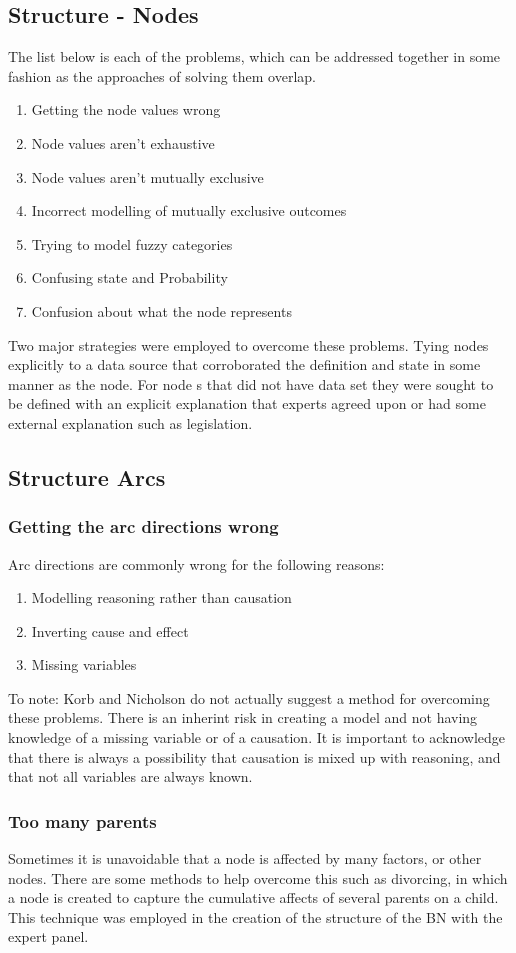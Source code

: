 \subsection{Structure - Nodes}
The list below is each of the problems, which can be addressed together in some fashion as the approaches of solving them overlap.
\begin{enumerate}
        \item Getting the node values wrong
        \item Node values aren't exhaustive
        \item Node values aren't mutually exclusive
        \item Incorrect modelling of mutually exclusive outcomes
        \item Trying to model fuzzy categories
        \item Confusing state and Probability
        \item Confusion about what the node represents
\end{enumerate}
Two major strategies were employed to overcome these problems. Tying nodes explicitly to a data source that corroborated the definition and state in some manner as the node. For node s that did not have data set they were sought to be defined with an explicit explanation that experts agreed upon or had some external explanation such as legislation.
\subsection{Structure Arcs}
\subsubsection{Getting the arc directions wrong}
Arc directions are commonly wrong for the following reasons:
\begin{enumerate}
        \item Modelling reasoning rather than causation
        \item Inverting cause and effect
        \item Missing variables
\end{enumerate}
To note: Korb and Nicholson do not actually suggest a method for overcoming these problems. There is an inherint risk in creating a model and not having knowledge of a missing variable or of a causation. It is important to acknowledge that there is always a possibility that causation is mixed up with reasoning, and that not all variables are always known.
\subsubsection{Too many parents}
Sometimes it is unavoidable that a node is affected by many factors, or other nodes. There are some methods to help overcome this such as divorcing, in which a node is created to capture the cumulative affects of several parents on a child. This technique was employed in the creation of the structure of the BN with the expert panel.
